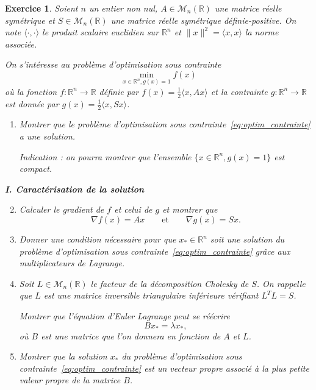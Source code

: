 \documentclass[11pt]{article}
\newcommand{\Mm}{\mathcal{M}}
\newcommand{\bR}{\mathbb R}
\theoremstyle{exostyle}
\newtheorem{exercice}{Exercice}
\begin{document}

\newpage

\begin{exercice}
  Soient $n$ un entier non nul, $A\in \Mm_{n}(\bR)$ une matrice réelle symétrique et $S\in \Mm_{n}(\bR)$ une matrice réelle symétrique définie-positive. 
  On note $\langle \cdot, \cdot \rangle$ le produit scalaire euclidien sur $\bR^n$ et $\|x\|^2 = \langle x,x \rangle$ la norme associée.
  
  On s'intéresse au problème d’optimisation sous contrainte 
  \begin{equation}
    \label{eq:optim_contrainte}
    \min_{x \in \bR^n, g(x) = 1} f(x)  
  \end{equation}
  où la fonction $f:\bR^n \rightarrow \bR$ définie par
$f(x) = \frac{1}{2} \langle x, A x \rangle $
et la contrainte $g:\bR^n \rightarrow \bR$ est donnée par $g(x) =\frac{1}{2} \langle x, S x \rangle $. \\
  
\begin{enumerate}
  \item Montrer que le problème d’optimisation sous contrainte~\eqref{eq:optim_contrainte} a une solution.
  
  \emph{Indication :} on pourra montrer que l’ensemble $\lbrace x \in \bR^n, g(x) = 1 \rbrace$ est compact.
\end{enumerate}

\medskip

{\bf I. Caractérisation de la solution}

\begin{enumerate}
\setcounter{enumi}{1}
 \item \label{q:calcul-gradient_1} 
 Calculer le gradient de $f$ et celui de $g$ et montrer que
$$
\nabla f(x) = A x \qquad \mbox{et} \qquad \nabla g(x) =  Sx.
$$
  \item Donner une condition nécessaire pour que $x_* \in \bR^n$ soit une solution du problème d’optimisation sous contrainte~\eqref{eq:optim_contrainte} grâce aux multiplicateurs de Lagrange. 
  \item 
  Soit $L \in \Mm_n(\bR)$ le facteur de la décomposition Cholesky de $S$. 
  On rappelle que $L$ est une matrice inversible triangulaire inférieure vérifiant $L^T L = S$.

  Montrer que l’équation d’Euler Lagrange peut se réécrire 
  \[
    B x_* = \lambda x_*,  
  \]
  où $B$ est une matrice que l’on donnera en fonction de $A$ et $L$.
  \item Montrer que la solution $x_*$  du problème d’optimisation sous contrainte~\eqref{eq:optim_contrainte} est un vecteur propre associé à la plus petite valeur propre de la matrice $B$.
\end{enumerate}  


\end{exercice}
\end{document}
